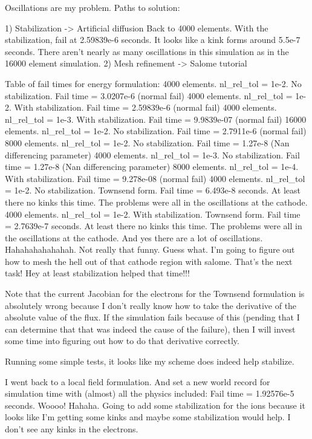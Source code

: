 Oscillations are my problem. Paths to solution:

1) Stabilization -> Artificial diffusion
   Back to 4000 elements. With the stabilization, fail at 2.59839e-6 seconds. It looks like a kink forms around 5.5e-7 seconds. There aren't nearly as many oscillations in this simulation as in the 16000 element simulation.
2) Mesh refinement -> Salome tutorial

Table of fail times for energy formulation:
4000 elements. nl_rel_tol = 1e-2. No stabilization. Fail time = 3.0207e-6 (normal fail)
4000 elements. nl_rel_tol = 1e-2. With stabilization. Fail time = 2.59839e-6 (normal fail)
4000 elements. nl_rel_tol = 1e-3. With stabilization. Fail time = 9.9839e-07 (normal fail)
16000 elements. nl_rel_tol = 1e-2. No stabilization. Fail time = 2.7911e-6 (normal fail)
8000 elements. nl_rel_tol = 1e-2. No stabilization. Fail time = 1.27e-8 (Nan differencing parameter)
4000 elements. nl_rel_tol = 1e-3. No stabilization. Fail time = 1.27e-8 (Nan differencing parameter)
8000 elements. nl_rel_tol = 1e-4. With stabilization. Fail time = 9.278e-08 (normal fail)
4000 elements. nl_rel_tol = 1e-2. No stabilization. Townsend form. Fail time = 6.493e-8 seconds. At least there no kinks this time. The problems were all in the oscillations at the cathode.
4000 elements. nl_rel_tol = 1e-2. With stabilization. Townsend form. Fail time = 2.7639e-7 seconds. At least there no kinks this time. The problems were all in the oscillations at the cathode. And yes there are a lot of oscillations. Hahahahahahahah. Not really that funny. Guess what. I'm going to figure out how to mesh the hell out of that cathode region with salome. That's the next task! Hey at least stabilization helped that time!!!

Note that the current Jacobian for the electrons for the Townsend formulation is absolutely wrong because I don't really know how to take the derivative of the absolute value of the flux. If the simulation fails because of this (pending that I can determine that that was indeed the cause of the failure), then I will invest some time into figuring out how to do that derivative correctly.

Running some simple tests, it looks like my scheme does indeed help stabilize.

I went back to a local field formulation. And set a new world record for simulation time with (almost) all the physics included: Fail time = 1.92576e-5 seconds. Woooo! Hahaha. Going to add some stabilization for the ions because it looks like I'm getting some kinks and maybe some stabilization would help. I don't see any kinks in the electrons.

